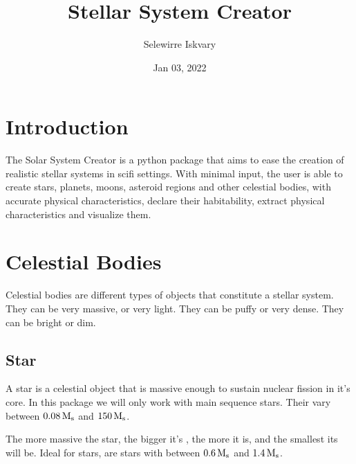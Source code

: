 \documentclass[letterpaper,10pt,english]{sphinxmanual}
\title{Stellar System Creator}
\date{Jan 03, 2022}
\author{Selewirre Iskvary}
\begin{document}
\pagestyle{empty}
\sphinxmaketitle
\pagestyle{plain}
\sphinxtableofcontents
\pagestyle{normal}
\label{\detokenize{index::doc}}



\chapter{Introduction}
\label{\detokenize{introduction:introduction}}\label{\detokenize{introduction::doc}}
\sphinxAtStartPar
The Solar System Creator is a python package that aims to ease the creation of realistic
stellar systems in sci\sphinxhyphen{}fi settings. With minimal input, the user is able to create stars, planets,
moons, asteroid regions and other celestial bodies, with accurate physical characteristics, declare their habitability,
extract physical characteristics and visualize them.


\chapter{Celestial Bodies}
\label{\detokenize{celestial_bodies/celestial_bodies:celestial-bodies}}\label{\detokenize{celestial_bodies/celestial_bodies::doc}}\label{\detokenize{celestial_bodies/celestial_bodies:id1}}
\sphinxAtStartPar
Celestial bodies are different types of objects that constitute a stellar system.
They can be very massive, or very light. They can be puffy or very dense.
They can be bright or dim.


\section{Star}
\label{\detokenize{celestial_bodies/star:star}}\label{\detokenize{celestial_bodies/star::doc}}\label{\detokenize{celestial_bodies/star:id1}}
\sphinxAtStartPar
A star is a celestial object that is massive enough to sustain nuclear fission in it’s core.
In this package we will only work with main sequence stars.
Their {\hyperref[\detokenize{quantities/material/mass:id1}]{}} vary between \(0.08 \, {\rm M_s}\) and \(150 \, {\rm M_s}\).

\sphinxAtStartPar
The more massive the star, the bigger it’s {\hyperref[\detokenize{quantities/geometric/radius:id1}]{}}, the more {\hyperref[\detokenize{quantities/surface/emission/luminosity:id1}]{}} it is,
and the smallest its {\hyperref[\detokenize{quantities/life/lifetime:id1}]{}} will be.
Ideal for {\hyperref[\detokenize{quantities/habitability/habitability:id1}]{}} stars, are stars with {\hyperref[\detokenize{quantities/material/mass:id1}]{}} between \(0.6 \, {\rm M_s}\)
and \(1.4 \, {\rm M_s}\).
\end{document}
